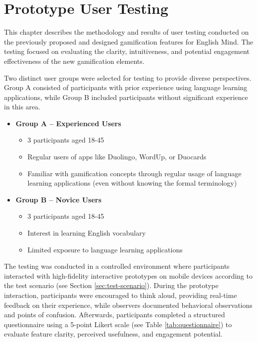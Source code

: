 \chapter{Prototype User Testing}
\label{chap:prototype-user-testing}

This chapter describes the methodology and results of user testing conducted on the previously proposed and designed gamification features for English Mind. The testing focused on evaluating the clarity, intuitiveness, and potential engagement effectiveness of the new gamification elements.

Two distinct user groups were selected for testing to provide diverse perspectives. Group A consisted of participants with prior experience using language learning applications, while Group B included participants without significant experience in this area.
\begin{itemize}
    \item \textbf{Group A – Experienced Users}
    \begin{itemize}
        \item 3 participants aged 18-45
        \item Regular users of apps like Duolingo, WordUp, or Duocards
        \item Familiar with gamification concepts through regular usage of language learning applications (even without knowing the formal terminology)
    \end{itemize}

    \item \textbf{Group B – Novice Users}
    \begin{itemize}
        \item 3 participants aged 18-45
        \item Interest in learning English vocabulary
        \item Limited exposure to language learning applications
    \end{itemize}
\end{itemize}

The testing was conducted in a controlled environment where participants interacted with high-fidelity interactive prototypes on mobile devices according to the test scenario (see Section \ref{sec:test-scenario}). During the prototype interaction, participants were encouraged to think aloud, providing real-time feedback on their experience, while observers documented behavioral observations and points of confusion. Afterwards, participants completed a structured questionnaire using a 5-point Likert scale (see Table \ref{tab:questionnaire}) to evaluate feature clarity, perceived usefulness, and engagement potential.


